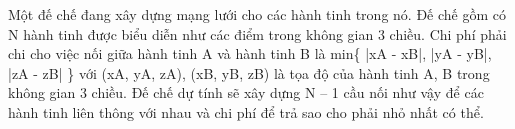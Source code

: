 Một đế chế đang xây dựng mạng lưới cho các hành tinh trong nó. Đế chế gồm có N hành tinh được biểu diễn như các điểm trong không gian 3 chiều. Chi phí phải chi cho việc nối giữa hành tinh A và hành tinh B là min\{ |xA - xB|, |yA - yB|, |zA - zB| \} với (xA, yA, zA), (xB, yB, zB) là tọa độ của hành tinh A, B trong không gian 3 chiều. Đế chế dự tính sẽ xây dựng N – 1 cầu nối như vậy để các hành tinh liên thông với nhau và chi phí để trả sao cho phải nhỏ nhất có thể.  

\